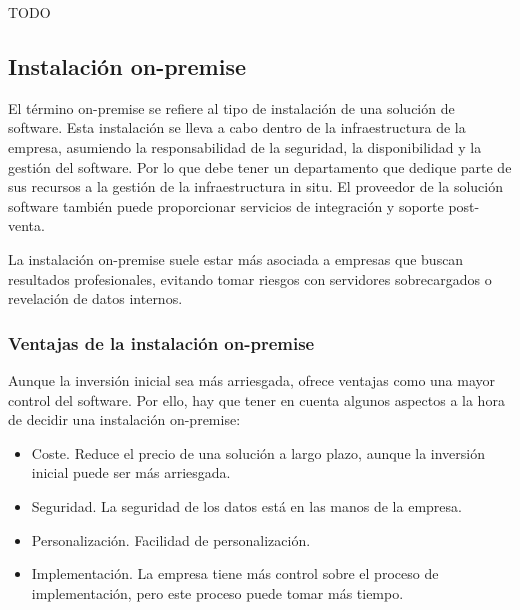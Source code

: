 TODO

\subsection{Instalación on-premise}

El término on-premise se refiere al tipo de instalación de una solución de software. Esta instalación se lleva a cabo dentro de la infraestructura de la empresa, asumiendo la responsabilidad de la seguridad, la disponibilidad y la gestión del software. Por lo que debe tener un departamento que dedique parte de sus recursos a la gestión de la infraestructura in situ. El proveedor de la solución software también puede proporcionar servicios de integración y soporte post-venta.

La instalación on-premise suele estar más asociada a empresas que buscan resultados profesionales, evitando tomar riesgos con servidores sobrecargados o revelación de datos internos.

\subsubsection{Ventajas de la instalación on-premise}

Aunque la inversión inicial sea más arriesgada, ofrece ventajas como una mayor control del software. Por ello, hay que tener en cuenta algunos aspectos a la hora de decidir una instalación on-premise:

\begin{itemize}
  \item Coste. Reduce el precio de una solución a largo plazo, aunque la inversión inicial puede ser más arriesgada.
  \item Seguridad. La seguridad de los datos está en las manos de la empresa.
  \item Personalización. Facilidad de personalización.
  \item Implementación. La empresa tiene más control sobre el proceso de implementación, pero este proceso puede tomar más tiempo.
\end{itemize}
